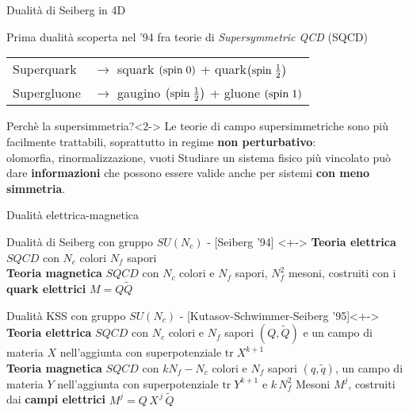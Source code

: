 \documentclass[10pt,compress,usenames,dvipsnames]{beamer}
\begin{document}
\begin{frame}{Dualità di Seiberg in 4D}

Prima dualità scoperta nel '94 fra teorie di \emph{Supersymmetric QCD} (SQCD)
\begin{table}
\begin{tabular}{l l}
Superquark \quad & $\longrightarrow$ \quad squark $\left( \hbox{spin} \;  0 \right)$ + quark$\left (\hbox{spin} \;  \frac{1}{2} \right)$ \\
Supergluone \quad &  $\longrightarrow$ \quad gaugino $\left (\hbox{spin} \;  \frac{1}{2} \right)$ + gluone  $\left( \hbox{spin} \;  1 \right)$ \\
\end{tabular}
\end{table}

\begin{block}{Perchè la supersimmetria?}<2->
Le teorie di campo supersimmetriche sono più facilmente trattabili, soprattutto in regime \alert{\bfseries non perturbativo}:\\
olomorfia, rinormalizzazione, vuoti 
\vspace{0.1cm}
Studiare un sistema fisico più vincolato può dare \alert{\bfseries informazioni} che possono essere valide anche per sistemi \alert{\bfseries con meno simmetria}.  
\end{block}


\end{frame}



\begin{frame}{Dualità elettrica-magnetica}

\begin{block}{Dualità di Seiberg con gruppo $SU(N_c)$ - [Seiberg '94] }<+->
{\bfseries  Teoria elettrica}  \quad   $SQCD$ con $N_c$ colori $N_f$ sapori \\[0.1cm]
{\bfseries   Teoria magnetica} \quad   $SQCD$ con $N_c$ colori e $N_f$ sapori,  $N_f^2$  mesoni,   costruiti con i \alert{\bfseries quark elettrici} $M = Q\tilde{Q}$\\
\end{block}

\vspace{0.5cm}


\begin{block}{Dualità KSS con gruppo $SU(N_c)$ - [Kutasov-Schwimmer-Seiberg '95]}<+->
{\bfseries  Teoria elettrica}  \quad  $SQCD$ con  $N_c$ colori e $N_f$ sapori $(Q,\tilde{Q})$ e un campo di materia $X$ nell'aggiunta con superpotenziale $\mathrm{tr} \; X^{k+1}$\\[0.1cm]
{\bfseries  Teoria magnetica}  \quad  $SQCD$ con $k N_f - N_c$ colori e $N_f$ sapori $(q,\tilde{q})$, un campo di materia $Y$ nell'aggiunta con superpotenziale $\mathrm{tr}\; Y^{k+1}$ e  $ k \, N_f^2$  Mesoni $M^j$, costruiti dai \alert{\bfseries campi elettrici} $M^j = Q \, X^{\,j} \, \tilde{Q}$\\
\end{block}
\vfill 
\end{frame}
\end{document}
